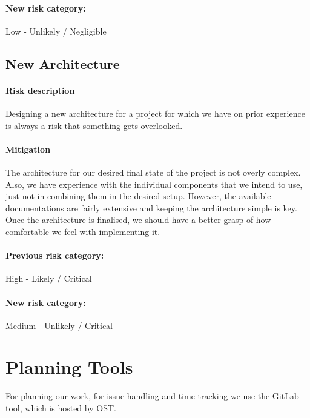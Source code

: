 \paragraph{New risk category:} Low - Unlikely / Negligible

\subsection{New Architecture}
\paragraph{Risk description} Designing a new architecture for a project for which we have on prior experience is always a risk that something gets overlooked.
\paragraph{Mitigation} The architecture for our desired final state of the project is not overly complex. Also, we have experience with the individual components that we intend to use, just not in combining them in the desired setup. However, the available documentations are fairly extensive and keeping the architecture simple is key. Once the architecture is finalised, we should have a better grasp of how comfortable we feel with implementing it.
\paragraph{Previous risk category:} High - Likely / Critical
\paragraph{New risk category:} Medium - Unlikely / Critical


\section{Planning Tools}
For planning our work, for issue handling and time tracking we use the GitLab tool, which is hosted by OST.
